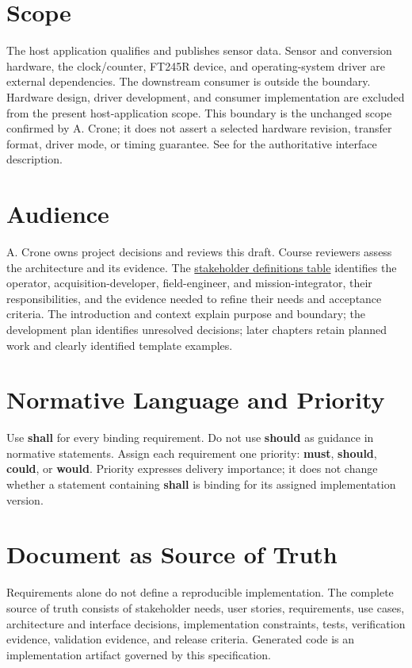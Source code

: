\section{Scope}
The host application qualifies and publishes sensor data. Sensor and
conversion hardware, the clock/counter, FT245R device, and operating-system
driver are external dependencies. The downstream consumer is outside the
boundary. Hardware design, driver development, and consumer implementation
are excluded from the present host-application scope. This boundary is the
unchanged scope confirmed by A. Crone; it does not assert a selected hardware
revision, transfer format, driver mode, or timing guarantee.
See  for the authoritative interface description.

\section{Audience}
A. Crone owns project decisions and reviews this draft. Course reviewers
assess the architecture and its evidence. The \hyperref[Table:StakeholderDefinitions]{stakeholder definitions table}
identifies the operator, acquisition-developer, field-engineer, and
mission-integrator, their responsibilities, and the evidence needed to refine
their needs and acceptance criteria.
The introduction and context explain purpose and boundary; the development
plan identifies unresolved decisions; later chapters retain planned work and
clearly identified template examples.

\section{Normative Language and Priority}
Use \textbf{shall} for every binding requirement. Do not use \textbf{should} as
guidance in normative statements. Assign each requirement one priority:
\textbf{\gls{must}}, \textbf{\gls{should}}, \textbf{\gls{could}}, or
\textbf{\gls{would}}. Priority expresses delivery importance; it does not change
whether a statement containing \textbf{shall} is binding for its assigned
implementation version.

\section{Document as Source of Truth}
Requirements alone do not define a reproducible implementation. The complete
source of truth consists of stakeholder needs, user stories, requirements, use
cases, architecture and interface decisions, implementation constraints,
tests, verification evidence, validation evidence, and release criteria.
Generated code is an implementation artifact governed by this specification.

